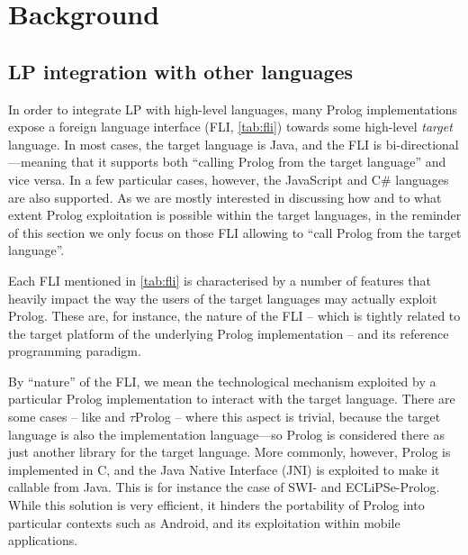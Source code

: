 \documentclass[12pt,a4paper,openright,twoside]{book}
\begin{document}
\section{Background}\label{sec:sota}

\subsection{LP integration with other languages}

%
In order to integrate LP with high-level languages, many Prolog implementations expose a foreign language interface (FLI, \cref{tab:fli}) towards some high-level \emph{target} language.
%
In most cases, the target language is Java, and the FLI is bi-directional---meaning that it supports both ``calling Prolog from the target language'' and vice versa.
%
In a few particular cases, however, the JavaScript and C\# languages are also supported.
%
As we are mostly interested in discussing how and to what extent Prolog exploitation is  possible within the target languages, in the reminder of this section we only focus on those FLI allowing to ``call Prolog from the target language''.

Each FLI mentioned in \cref{tab:fli} is characterised by a number of features that heavily impact the way the users of the target languages may actually exploit Prolog.
%
These are, for instance, the nature of the FLI -- which is tightly related to the target platform of the underlying Prolog implementation -- and its reference programming paradigm.

By ``nature'' of the FLI, we mean the technological mechanism exploited by a particular Prolog implementation to interact with the target language.
%
There are some cases -- like \tuprolog{} and $\tau$Prolog -- where this aspect is trivial, because the target language is also the implementation language---so Prolog is considered there as just another library for the target language.
%
More commonly, however, Prolog is implemented in C, and the Java Native Interface (JNI) is exploited to make it callable from Java.
%
This is for instance the case of SWI- and ECLiPSe-Prolog.
%
While this solution is very efficient, it hinders the portability of Prolog into particular contexts such as Android, and its exploitation within mobile applications.
\end{document}
